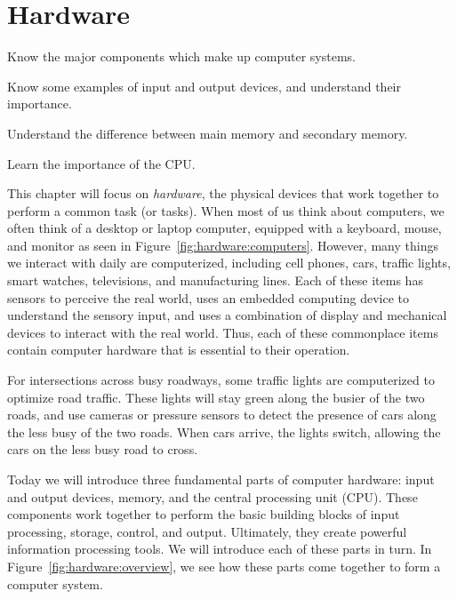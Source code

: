 \chapter{Hardware}

\begin{goals}
\item Know the major components which make up computer systems.
\item Know some examples of input and output devices, and understand their importance.
\item Understand the difference between main memory and secondary memory.
\item Learn the importance of the CPU.
\end{goals}

This chapter will focus on \emph{hardware}, the physical devices that work together to perform a common task (or tasks).  When most of us think about computers, we often think of a desktop or laptop computer, equipped with a keyboard, mouse, and monitor as seen in Figure~\ref{fig:hardware:computers}. However, many things we interact with daily are computerized, including cell phones, cars, traffic lights, smart watches, televisions, and manufacturing lines. Each of these items has sensors to perceive the real world, uses an embedded computing device to understand the sensory input, and uses a combination of display and mechanical devices to interact with the real world. Thus, each of these commonplace items contain computer hardware that is essential to their operation.


\begin{example}\label{exmp:traffic_light}
  For intersections across busy roadways, some traffic lights are computerized to optimize road traffic. These lights will stay green along the busier of the two roads, and use cameras or pressure sensors to detect the presence of cars along the less busy of the two roads. When cars arrive, the lights switch, allowing the cars on the less busy road to cross.
\end{example}

Today we will introduce three fundamental parts of computer hardware: input and output devices, memory, and the central processing unit (CPU). These components work together to perform the basic building blocks of input processing, storage, control, and output. Ultimately, they create powerful information processing tools. We will introduce each of these parts in turn. In Figure~\ref{fig:hardware:overview}, we see how these parts come together to form a computer system.


